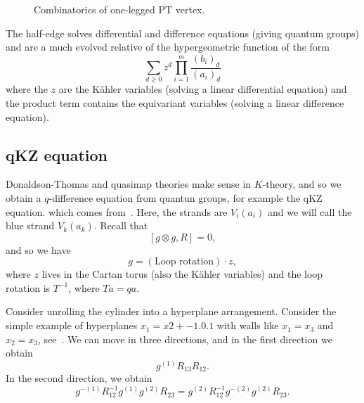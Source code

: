 \documentclass[leqno, openany]{memoir}
\theoremstyle{definition}
\theoremstyle{remark}
\theoremstyle{plain}
\theoremstyle{definition}
\theoremstyle{remark}
\DeclareMathOperator{\Hilb}{Hilb}
\begin{document}
\begin{figure}[h]
    \centering
    \caption{Combinatorics of one-legged PT vertex.}
    \label{fig:ptcomb}
\end{figure}

The half-edge solves differential and difference equations (giving quantum groups) and are a much evolved relative of the hypergeometric function of the form
\[ \sum_{d \geq 0} z^d \prod_{i=1}^m \frac{(b_i)_d}{(a_i)_d} \]
where the $z$ are the K\"ahler variables (solving a linear differential equation) and the product term contains the equivariant variables (solving a linear difference equation).

\subsection{qKZ equation}

Donaldson-Thomas and quasimap theories make sense in $K$-theory, and so we obtain a $q$-difference equation from quantun groups, for example the qKZ equation. which comes from~. Here, the strands are $V_i(a_i)$ and we will call the blue strand $V_k(a_k)$. Recall that
\[ [g \otimes g, R] = 0, \]
and so we have 
\[ g = (\text{Loop rotation}) \cdot z, \]
where $z$ lives in the Cartan torus (also the K\"ahler variables) and the loop rotation is $T^{-1}$, where $Ta = qa$. 

Consider unrolling the cylinder into a hyperplane arrangement. Consider the simple example of hyperplanes $x_1=x2+\qty{-1,0,1}$ with walls like $x_1=x_3$ and $x_2=x_3$, see~. We can move in three directions, and in the first direction we obtain
\[ g^{(1)} R_{13} R_{12}. \]
In the second direction, we obtain
\[ g^{-(1)} R_{12}^{-1} g^{(1)} g^{(2)} R_{23} = g^{(2)} R_{12}^{-1} g^{-(2)} g^{(2)} R_{23}. \]
\end{document}
